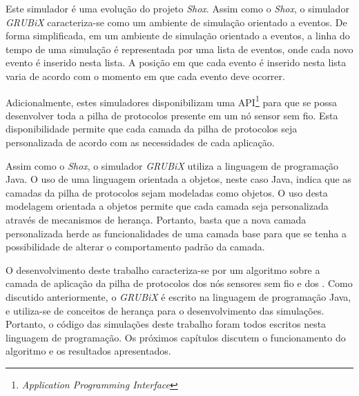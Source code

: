 Este simulador é uma evolução do projeto \emph{Shox}\cite{shox}. Assim como o \emph{Shox}, o simulador \emph{GRUBiX} caracteriza-se como um ambiente de simulação orientado a eventos. De forma simplificada, em um ambiente de simulação orientado a eventos, a linha do tempo de uma simulação é representada por uma lista de eventos, onde cada novo evento é inserido nesta lista. A posição em que cada evento é inserido nesta lista varia de acordo com o momento em que cada evento deve ocorrer.

Adicionalmente, estes simuladores disponibilizam uma API\footnote{\emph{Application Programming Interface}} para que se possa desenvolver toda a pilha de protocolos presente em um nó sensor sem fio. Esta disponibilidade permite que cada camada da pilha de protocolos seja personalizada de acordo com as necessidades de cada aplicação.

Assim como o \emph{Shox}, o simulador \emph{GRUBiX} utiliza a linguagem de programação Java. O uso de uma linguagem orientada a objetos, neste caso Java, indica que as camadas da pilha de protocolos sejam modeladas como objetos. O uso desta modelagem orientada a objetos permite que cada camada seja personalizada através de mecanismos de herança. Portanto, basta que a nova camada personalizada herde as funcionalidades de uma camada base para que se tenha a possibilidade de alterar o comportamento padrão da camada.


O desenvolvimento deste trabalho caracteriza-se por um algoritmo sobre a camada de aplicação da pilha de protocolos dos nós sensores sem fio e dos \vants. Como discutido anteriormente, o \emph{GRUBiX} é escrito na linguagem de programação Java, e utiliza-se de conceitos de herança para o desenvolvimento das simulações. Portanto, o código das simulações deste trabalho foram todos escritos nesta linguagem de programação. Os próximos capítulos discutem o funcionamento do algoritmo e os resultados apresentados.




